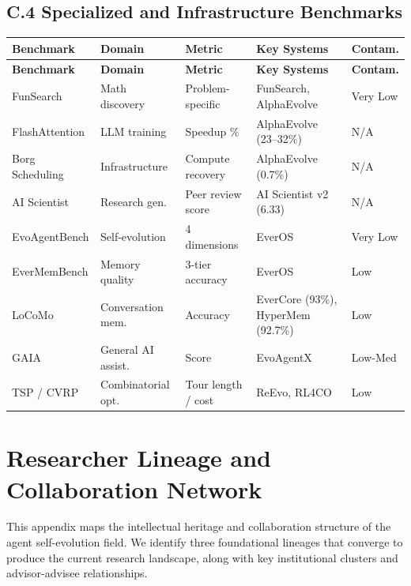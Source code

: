 \subsection*{C.4 Specialized and Infrastructure Benchmarks}

\begin{longtable}{p{22mm}p{18mm}p{22mm}p{28mm}p{14mm}}
\toprule
\textbf{Benchmark} & \textbf{Domain} & \textbf{Metric} & \textbf{Key Systems} & \textbf{Contam.} \\
\midrule
\endfirsthead
\toprule
\textbf{Benchmark} & \textbf{Domain} & \textbf{Metric} & \textbf{Key Systems} & \textbf{Contam.} \\
\midrule
\endhead

FunSearch & Math discovery & Problem-specific & FunSearch, AlphaEvolve & Very Low \\
FlashAttention & LLM training & Speedup \% & AlphaEvolve (23--32\%) & N/A \\
Borg Scheduling & Infrastructure & Compute recovery & AlphaEvolve (0.7\%) & N/A \\
AI Scientist & Research gen. & Peer review score & AI Scientist v2 (6.33) & N/A \\
EvoAgentBench & Self-evolution & 4 dimensions & EverOS & Very Low \\
EverMemBench & Memory quality & 3-tier accuracy & EverOS & Low \\
LoCoMo & Conversation mem. & Accuracy & EverCore (93\%), HyperMem (92.7\%) & Low \\
GAIA & General AI assist. & Score & EvoAgentX & Low-Med \\
TSP / CVRP & Combinatorial opt. & Tour length / cost & ReEvo, RL4CO & Low \\
\bottomrule
\end{longtable}


\newpage
\section{Researcher Lineage and Collaboration Network}
\label{app:lineage}

This appendix maps the intellectual heritage and collaboration structure of the agent self-evolution field. We identify three foundational lineages that converge to produce the current research landscape, along with key institutional clusters and advisor-advisee relationships.

